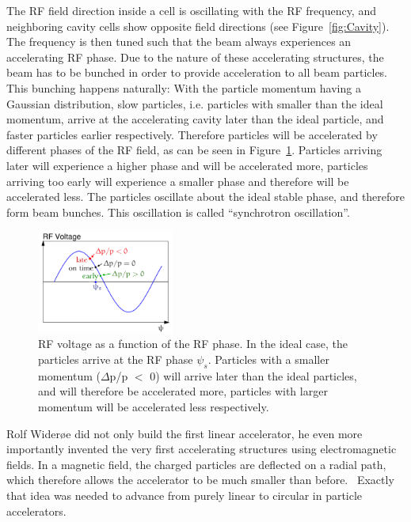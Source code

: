 The RF field direction inside a cell is oscillating with the RF frequency, and neighboring cavity cells show opposite field directions (see Figure~\ref{fig:Cavity}).
The frequency is then tuned such that the beam always experiences an accelerating RF phase. 
Due to the nature of these accelerating structures, the beam has to be bunched in order to provide acceleration to all beam particles.
This bunching happens naturally:
With the particle momentum having a Gaussian distribution, slow particles, i.e. particles with smaller than the ideal momentum, arrive at the accelerating cavity later than the ideal particle, and faster particles earlier respectively.
Therefore particles will be accelerated by different phases of the RF field, as can be seen in Figure~\ref{fig:RFPhase}.
Particles arriving later will experience a higher phase and will be accelerated more, particles arriving too early will experience a smaller phase and therefore will be accelerated less.
The particles oscillate about the ideal stable phase, and therefore form beam bunches.
This oscillation is called ``synchrotron oscillation''.
\begin{figure}
\centering
\includegraphics[width=0.4\textwidth]{Figures/RFphase.png}
\caption[Phase focusing]{RF voltage as a function of the RF phase. In the ideal case, the particles arrive at the RF phase $\psi_s$. 
Particles with a smaller momentum ($\Delta$p/p $<$ 0) will arrive later than the ideal particles, and will therefore be accelerated more, particles with larger momentum will be accelerated less respectively.}
\label{fig:RFPhase}
\end{figure}

Rolf Wider\o e did not only build the first linear accelerator, he even more importantly invented the very first accelerating structures using electromagnetic fields.
In a magnetic field, the charged particles are deflected on a radial path, which therefore allows the accelerator to be much smaller than before.~\cite[cf. p. 8]{Wilson}
Exactly that idea was needed to advance from purely linear to circular in particle accelerators.

